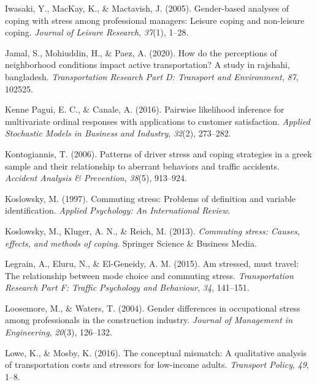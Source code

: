 \documentclass[
11pt, %
oneside, %
english, %
singlespacing, %
]{macthesis} %
\newlength{\cslhangindent}
\newenvironment{CSLReferences}[2] %
 {%
  \setlength{\parindent}{0pt}
  \ifodd #1 \everypar{\setlength{\hangindent}{\cslhangindent}}\ignorespaces\fi
  \ifnum #2 > 0
  \setlength{\parskip}{#2\baselineskip}
  \fi
 }%
 {}
\begin{document}
\begin{CSLReferences}{1}{0}
\leavevmode{}%
Iwasaki, Y., MacKay, K., \& Mactavish, J. (2005). Gender-based analyses of coping with stress among professional managers: Leisure coping and non-leisure coping. \emph{Journal of Leisure Research}, \emph{37}(1), 1--28.

\leavevmode{}%
Jamal, S., Mohiuddin, H., \& Paez, A. (2020). How do the perceptions of neighborhood conditions impact active transportation? A study in rajshahi, bangladesh. \emph{Transportation Research Part D: Transport and Environment}, \emph{87}, 102525.

\leavevmode{}%
Kenne Pagui, E. C., \& Canale, A. (2016). Pairwise likelihood inference for multivariate ordinal responses with applications to customer satisfaction. \emph{Applied Stochastic Models in Business and Industry}, \emph{32}(2), 273--282.

\leavevmode{}%
Kontogiannis, T. (2006). Patterns of driver stress and coping strategies in a greek sample and their relationship to aberrant behaviors and traffic accidents. \emph{Accident Analysis \& Prevention}, \emph{38}(5), 913--924.

\leavevmode{}%
Koslowsky, M. (1997). Commuting stress: Problems of definition and variable identification. \emph{Applied Psychology: An International Review}.

\leavevmode{}%
Koslowsky, M., Kluger, A. N., \& Reich, M. (2013). \emph{Commuting stress: Causes, effects, and methods of coping}. Springer Science \& Business Media.

\leavevmode{}%
Legrain, A., Eluru, N., \& El-Geneidy, A. M. (2015). Am stressed, must travel: The relationship between mode choice and commuting stress. \emph{Transportation Research Part F: Traffic Psychology and Behaviour}, \emph{34}, 141--151.

\leavevmode{}%
Loosemore, M., \& Waters, T. (2004). Gender differences in occupational stress among professionals in the construction industry. \emph{Journal of Management in Engineering}, \emph{20}(3), 126--132.

\leavevmode{}%
Lowe, K., \& Mosby, K. (2016). The conceptual mismatch: A qualitative analysis of transportation costs and stressors for low-income adults. \emph{Transport Policy}, \emph{49}, 1--8.


\end{CSLReferences}
\end{document}
